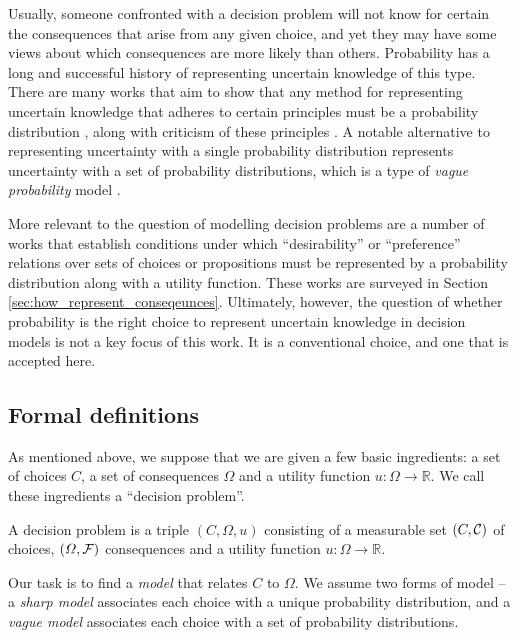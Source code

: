 Usually, someone confronted with a decision problem will not know for certain the consequences that arise from any given choice, and yet they may have some views about which consequences are more likely than others. Probability has a long and successful history of representing uncertain knowledge of this type. There are many works that aim to show that any method for representing uncertain knowledge that adheres to certain principles must be a probability distribution \citet{de_finetti_foresight_1992,horvitz_framework_1986}, along with criticism of these principles \citet{halpern_counter_1999}. A notable alternative to representing uncertainty with a single probability distribution represents uncertainty with a set of probability distributions, which is a type of \emph{vague probability} model \citep{walley_statistical_1991}. 

More relevant to the question of modelling decision problems are a number of works that establish conditions under which ``desirability'' or ``preference'' relations over sets of choices or propositions must be represented by a probability distribution along with a utility function. These works are surveyed in Section \ref{sec:how_represent_conseqeunces}. Ultimately, however, the question of whether probability is the right choice to represent uncertain knowledge in decision models is not a key focus of this work. It is a conventional choice, and one that is accepted here.

\subsection{Formal definitions}\label{sec:probability_set_models}

As mentioned above, we suppose that we are given a few basic ingredients: a set of choices $C$, a set of consequences $\Omega$ and a utility function $u:\Omega\to \mathbb{R}$. We call these ingredients a ``decision problem''.

\begin{definition}
A decision problem is a triple $(C,\Omega,u)$ consisting of a measurable set $(C,\mathcal{C})$ of choices, $(\Omega,\mathcal{F})$ consequences and a utility function $u:\Omega\to \mathbb{R}$.
\end{definition}

Our task is to find a \emph{model} that relates $C$ to $\Omega$. We assume two forms of model -- a \emph{sharp model} associates each choice with a unique probability distribution, and a \emph{vague model} associates each choice with a set of probability distributions.

